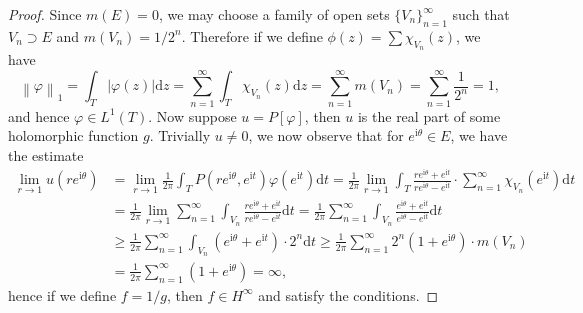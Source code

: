\begin{proof}
Since $m(E)=0$, we may choose a family of open sets $\{V_n\}_{n=1}^\infty$ such that $V_n\supset E$ and $m(V_n)=1/2^n$. Therefore if we define $\phi(z)=\sum\chi_{V_n}(z)$, we have 
$$
\left\| \varphi \right\| _1=\int_T{\left| \varphi \left( z \right) \right|\mathrm{d}z}=\sum_{n=1}^{\infty}{\int_T{\chi _{V_n}\left( z \right) \mathrm{d}z}}=\sum_{n=1}^{\infty}{m\left( V_n \right)}=\sum_{n=1}^{\infty}{\frac{1}{2^n}}=1,
$$
and hence $\varphi\in L^1(T)$. Now suppose $u=P[\varphi]$, then $u$ is the real part of some holomorphic function $g$. Trivially $u\ne 0$, we now observe that for $e^{\mathrm{i}\theta}\in E$, we have the estimate 
$$
\begin{aligned}
\lim_{r\rightarrow 1} u\left( re^{\mathrm{i}\theta} \right) &=\lim_{r\rightarrow 1} \frac{1}{2\pi}\int_T{P\left( re^{\mathrm{i}\theta},e^{\mathrm{i}t} \right) \varphi \left( e^{\mathrm{i}t} \right) \mathrm{d}t}=\frac{1}{2\pi}\lim_{r\rightarrow 1} \int_T{\frac{re^{\mathrm{i}\theta}+e^{\mathrm{i}t}}{re^{\mathrm{i}\theta}-e^{\mathrm{i}t}}\cdot \sum_{n=1}^{\infty}{\chi _{V_n}\left( e^{\mathrm{i}t} \right)}\mathrm{d}t}
\\
&=\frac{1}{2\pi}\lim_{r\rightarrow 1} \sum_{n=1}^{\infty}{\int_{V_n}{\frac{re^{\mathrm{i}\theta}+e^{\mathrm{i}t}}{re^{\mathrm{i}\theta}-e^{\mathrm{i}t}}\mathrm{d}t}}=\frac{1}{2\pi}\sum_{n=1}^{\infty}{\int_{V_n}{\frac{e^{\mathrm{i}\theta}+e^{\mathrm{i}t}}{e^{\mathrm{i}\theta}-e^{\mathrm{i}t}}}\mathrm{d}t}
\\
&\ge \frac{1}{2\pi}\sum_{n=1}^{\infty}{\int_{V_n}{\left( e^{\mathrm{i}\theta}+e^{\mathrm{i}t} \right) \cdot 2^n\mathrm{d}t}}\ge \frac{1}{2\pi}\sum_{n=1}^{\infty}{2^n\left( 1+e^{\mathrm{i}\theta} \right) \cdot m\left( V_n \right)}
\\
&=\frac{1}{2\pi}\sum_{n=1}^{\infty}{\left( 1+e^{\mathrm{i}\theta} \right)}=\infty ,
\end{aligned}
$$
hence if we define $f=1/g$, then $f\in H^\infty$ and satisfy the conditions.
\end{proof}